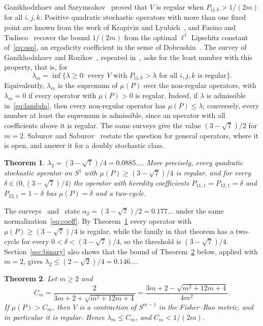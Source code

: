 \documentclass[11pt]{amsart}
\newtheorem{theorem}{Theorem}[section]
\theoremstyle{definition}
\theoremstyle{remark}
\begin{document}
Ganikhodzhaev and Sarymsakov~\cite{GS88} proved that $V$ is regular when $P_{ij,k}>1/(2m)$ for all $i,j,k$.
Positive quadratic stochastic operators with more than one fixed point are known from the work of Krapivin and
Lyubich~\cite{KL76}, and Fasino and Tudisco~\cite{FT20} recover the bound $1/(2m)$ from the optimal $\ell^1$ Lipschitz
constant of~\eqref{eq:qso}, an ergodicity coefficient in the sense of Dobrushin~\cite{Dobrushin56}. The
survey of Ganikhodzhaev and Rozikov~\cite[Theorem~7 and Problem~12]{GR09}, repeated in~\cite[Theorem~2.28 and
Problem~2.29]{GMR11}, asks for the least number with this property, that is, for
\begin{equation}\label{eq:lambda}
\lambda_m=\inf\bigl\{\lambda\ge0:\ \text{every $V$ with $P_{ij,k}>\lambda$ for all $i,j,k$ is regular}\bigr\}.
\end{equation}
Equivalently, $\lambda_m$ is the supremum of $\mu(P)$ over the non-regular operators, with $\lambda_m=0$ if every
operator with $\mu(P)>0$ is regular. Indeed, if $\lambda$ is admissible in~\eqref{eq:lambda}, then every non-regular
operator has $\mu(P)\le\lambda$; conversely, every number at least the supremum is admissible, since an operator with
all coefficients above it is regular. The same surveys give the value $(3-\sqrt7)/2$ for $m=2$. Saburov and
Saburov~\cite{SS25} restate the question for general operators, where it is open, and answer it for a doubly
stochastic class.

\begin{theorem}\label{thm:binary}
$\lambda_2=(3-\sqrt7)/4=0.0885\dots$. More precisely, every quadratic stochastic operator on $S^1$ with
$\mu(P)\ge(3-\sqrt7)/4$ is regular, and for every $\delta\in\bigl(0,(3-\sqrt7)/4\bigr)$ the operator with heredity
coefficients $P_{11,1}=P_{12,1}=\delta$ and $P_{22,1}=1-\delta$ has $\mu(P)=\delta$ and a two-cycle.
\end{theorem}

The surveys~\cite[Theorem~7(2)]{GR09} and~\cite[Theorem~2.28(ii)]{GMR11} state $\alpha_2=(3-\sqrt7)/2=0.177\dots$
under the same normalization~\eqref{eq:coeff}. By Theorem~\ref{thm:binary} every operator with $\mu(P)\ge(3-\sqrt7)/4$ is
regular, while the family in that theorem has a two-cycle for every $0<\delta<(3-\sqrt7)/4$, so the threshold is
$(3-\sqrt7)/4$. Section~\ref{sec:binary} also shows that the bound of
Theorem~\ref{thm:upper} below, applied with $m=2$, gives $\lambda_2\le(2-\sqrt2)/4=0.146\dots$.

\begin{theorem}\label{thm:upper}
Let $m\ge2$ and
\[
C_m=\frac{2}{3m+2+\sqrt{m^2+12m+4}}=\frac{3m+2-\sqrt{m^2+12m+4}}{4m^2}.
\]
If $\mu(P)>C_m$, then $V$ is a contraction of $S^{m-1}$ in the Fisher--Rao metric, and in particular it is regular.
Hence $\lambda_m\le C_m$, and $C_m<1/(2m)$.
\end{theorem}
\end{document}

